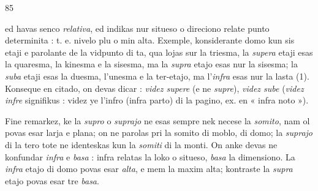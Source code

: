 \begin{VUpage}[89]{85}

 ed  havas senco \textit{relativa}, ed indikas nur situeso\nl
o direciono relate punto determinita : t. e. nivelo plu o min\nl
alta. Exemple, konsiderante domo kun sis etaji e parolante\nl
de la vidpunto di ta, qua lojas sur la triesma, la \textit{supera} etaji\nl
esas la quaresma, la kinesma e la sisesma, ma la \textit{supra} etajo\nl
esas nur la sisesma; la \textit{suba} etaji esas la duesma, l'unesma\nl
e la ter-etajo, ma l'\textit{infra} esas nur la lasta (1). Konseque en\nl
citado, on devas dicar : \textit{videz supere} (e ne \textit{supre}), \textit{videz sube}\nl
(\textit{videz infre} signifikus : videz ye l'infro (infra parto) di la\nl
pagino, ex. en « infra noto »).

Fine remarkez, ke la \textit{supro} o \textit{suprajo} ne esas sempre nek\nl
necese la \textit{somito}, nam ol povas esar larja e plana; on ne\nl
parolas pri la somito di moblo, di domo; la \textit{suprajo} di la\nl
tero tote ne identeskas kun la \textit{somiti} di la monti. On anke\nl
devas ne konfundar \textit{infra} e \textit{basa} : infra relatas la loko o\nl
situeso, \textit{basa} la dimensiono. La \textit{infra} etajo di domo povas\nl
esar \textit{alta}, e mem la maxim alta; kontraste la \textit{supra} etajo povas\nl
esar tre \textit{basa}.


\end{VUpage}
